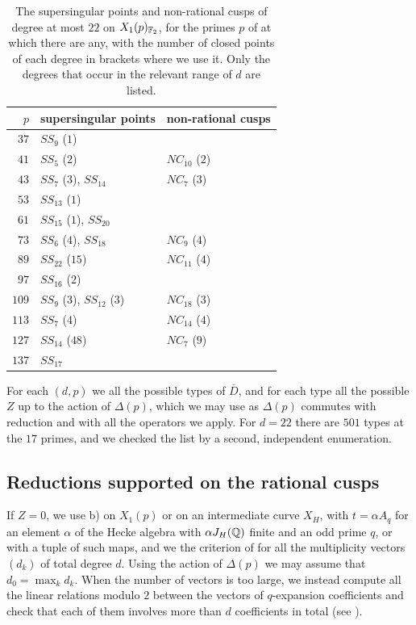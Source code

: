 \begin{table}[H]
\centering
\begin{tabular}{rll}
\toprule
$p$ & supersingular points & non-rational cusps\\
\midrule
$37$ & $SS_9$ ($1$) & \\
$41$ & $SS_5$ ($2$) & $NC_{10}$ ($2$)\\
$43$ & $SS_7$ ($3$), $SS_{14}$ & $NC_7$ ($3$)\\
$53$ & $SS_{13}$ ($1$) & \\
$61$ & $SS_{15}$ ($1$), $SS_{20}$ & \\
$73$ & $SS_6$ ($4$), $SS_{18}$ & $NC_9$ ($4$)\\
$89$ & $SS_{22}$ ($15$) & $NC_{11}$ ($4$)\\
$97$ & $SS_{16}$ ($2$) & \\
$109$ & $SS_9$ ($3$), $SS_{12}$ ($3$) & $NC_{18}$ ($3$)\\
$113$ & $SS_7$ ($4$) & $NC_{14}$ ($4$)\\
$127$ & $SS_{14}$ ($48$) & $NC_7$ ($9$)\\
$137$ & $SS_{17}$ & \\
\bottomrule
\end{tabular}
\medskip
\caption{The supersingular points and non-rational cusps of degree at most $22$ on $X_1(p)_{\mathbb{F}_2}$, for the primes $p$ of  at which there are any, with the number of closed points of each degree in brackets where we use it. Only the degrees that occur in the relevant range of $d$ are listed.}
\label{table:nonordinary}
\end{table}

For each $(d,p)$ we  all the possible types of $\overline D$, and for each type all the possible $Z$ up to the action of $\Delta(p)$, which we may use as $\Delta(p)$ commutes with reduction and with all the operators we apply. For $d=22$ there are $501$ types at the $17$ primes, and we checked the list by a second, independent enumeration.

\subsection{Reductions supported on the rational cusps}
If $Z=0$, we use  b) on $X_1(p)$ or on an intermediate curve $X_H$, with $t=\alpha A_q$ for an element $\alpha$ of the Hecke algebra with $\alpha J_H(\mathbb{Q})$ finite and an odd prime $q$, or with a tuple of such maps, and we  the criterion of \cite[Proposition 5.3]{DKSS} for all the multiplicity vectors $(d_k)$ of total degree $d$. Using the action of $\Delta(p)$ we may assume that $d_0=\max_kd_k$. When the number of vectors is too large, we instead compute all the linear relations modulo $2$ between the vectors of $q$-expansion coefficients and check that each of them involves more than $d$ coefficients in total (see \cite[Lemma 5.5]{DKSS}).

